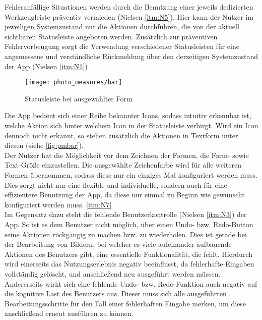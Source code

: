 Fehleranfällige Situationen werden durch die Benutzung einer jeweils dedizierten Werkzeugleiste präventiv vermieden (Nielsen \autoref{itm:N5}).
Hier kann der Nutzer im jeweiligen Systemzustand nur die Aktionen durchführen, die von der aktuell sichtbaren Statusleiste angeboten werden.
Zusätzlich zur präventiven Fehlervorbeugung sorgt die Verwendung verschiedener Statusleisten für eine angemessene und verständliche Rückmeldung über den derzeitigen Systemzustand der App (Nielsen \autoref{itm:N1}) \\

\begin{wrapfigure}{R}{0.4\textwidth}
  \centering
  \texttt{[image: photo\_measures/bar]}
  \caption{Statusleiste bei ausgewählter Form}
  \label{fig:pmbar}
\end{wrapfigure}

\noindent
Die App bedient sich einer Reihe bekannter Icons, sodass intuitiv erkennbar ist, welche Aktion sich hinter welchem Icon in der Statusleiste verbirgt.
Wird ein Icon dennoch nicht erkannt, so stehen zusätzlich die Aktionen in Textform unter diesen (siehe \autoref{fig:pmbar}). \\

Der Nutzer hat die Möglichkeit vor dem Zeichnen der Formen, die Form- sowie Text-Größe einzustellen.
Die ausgewählte Zeichenfarbe wird für alle weiteren Formen übernommen, sodass diese nur ein einziges Mal konfiguriert werden muss.
Dies sorgt nicht nur eine flexible und individuelle, sondern auch für eine effizientere Benutzung der App, da diese nur einmal zu Beginn wie gewünscht konfiguriert werden muss. \autoref{itm:N7} \\

Im Gegensatz dazu steht die fehlende Benutzerkontrolle (Nielsen \autoref{itm:N3}) der App.
So ist es dem Benutzer nicht möglich, über einen Undo- bzw. Redo-Button seine Aktionen rückgängig zu machen bzw. zu wiederholen.
Dies ist gerade bei der Bearbeitung von Bildern, bei welcher es viele aufeinander aufbauende Aktionen des Benutzers gibt, eine essentielle Funktionalität, die fehlt.
Hierdurch wird einerseits das Nutzungserlebnis negativ beeinflusst, da fehlerhafte Eingaben vollständig gelöscht, und anschließend neu ausgeführt werden müssen.
Andererseits wirkt sich eine fehlende Undo- bzw. Redo-Funktion auch negativ auf die kognitive Last des Benutzers aus.
Dieser muss sich alle ausgeführten Bearbeitungsschritte für den Fall einer fehlerhaften Eingabe merken, um diese anschließend erneut ausführen zu können. \\

